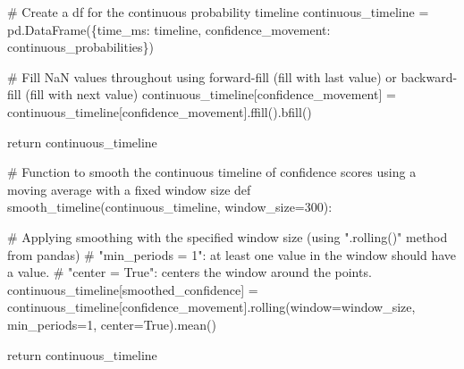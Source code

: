 \documentclass[
  letterpaper,
  DIV=11,
  numbers=noendperiod]{scrreprt}
\newenvironment{Shaded}{\begin{snugshade}}{\end{snugshade}}
\newcommand{\CommentTok}[1]{\textcolor[rgb]{0.37,0.37,0.37}{#1}}
\newcommand{\ControlFlowTok}[1]{\textcolor[rgb]{0.00,0.23,0.31}{#1}}
\newcommand{\DecValTok}[1]{\textcolor[rgb]{0.68,0.00,0.00}{#1}}
\newcommand{\KeywordTok}[1]{\textcolor[rgb]{0.00,0.23,0.31}{#1}}
\newcommand{\NormalTok}[1]{\textcolor[rgb]{0.00,0.23,0.31}{#1}}
\newcommand{\OperatorTok}[1]{\textcolor[rgb]{0.37,0.37,0.37}{#1}}
\newcommand{\StringTok}[1]{\textcolor[rgb]{0.13,0.47,0.30}{#1}}
\newcommand{\VariableTok}[1]{\textcolor[rgb]{0.07,0.07,0.07}{#1}}
\begin{document}
\begin{Shaded}
\begin{Highlighting}[]
    \CommentTok{\# Create a df for the continuous probability timeline}
\NormalTok{    continuous\_timeline }\OperatorTok{=}\NormalTok{ pd.DataFrame(\{}\StringTok{\textquotesingle{}time\_ms\textquotesingle{}}\NormalTok{: timeline, }\StringTok{\textquotesingle{}confidence\_movement\textquotesingle{}}\NormalTok{: continuous\_probabilities\})}

    \CommentTok{\# Fill NaN values throughout using forward{-}fill (fill with last value) or backward{-}fill (fill with next value)}
\NormalTok{    continuous\_timeline[}\StringTok{\textquotesingle{}confidence\_movement\textquotesingle{}}\NormalTok{] }\OperatorTok{=}\NormalTok{ continuous\_timeline[}\StringTok{\textquotesingle{}confidence\_movement\textquotesingle{}}\NormalTok{].ffill().bfill()}

    \ControlFlowTok{return}\NormalTok{ continuous\_timeline}

\CommentTok{\# Function to smooth the continuous timeline of confidence scores using a moving average with a fixed window size}
\KeywordTok{def}\NormalTok{ smooth\_timeline(continuous\_timeline, window\_size}\OperatorTok{=}\DecValTok{300}\NormalTok{):}

    \CommentTok{\# Applying smoothing with the specified window size (using ".rolling()" method from pandas)}
    \CommentTok{\# "min\_periods = 1": at least one value in the window should have a value.}
    \CommentTok{\# "center = True": centers the window around the points.}
\NormalTok{    continuous\_timeline[}\StringTok{\textquotesingle{}smoothed\_confidence\textquotesingle{}}\NormalTok{] }\OperatorTok{=}\NormalTok{ continuous\_timeline[}\StringTok{\textquotesingle{}confidence\_movement\textquotesingle{}}\NormalTok{].rolling(window}\OperatorTok{=}\NormalTok{window\_size, min\_periods}\OperatorTok{=}\DecValTok{1}\NormalTok{, center}\OperatorTok{=}\VariableTok{True}\NormalTok{).mean()}
    
    \ControlFlowTok{return}\NormalTok{ continuous\_timeline}
\end{Highlighting}
\end{Shaded}
\end{document}
